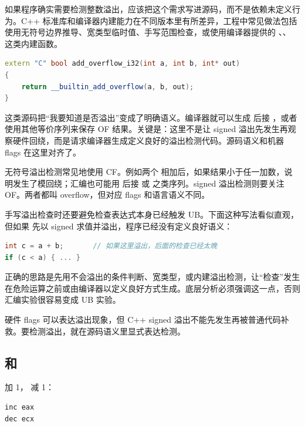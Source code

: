 如果程序确实需要检测整数溢出，应该把这个需求写进源码，而不是依赖未定义行为。C++ 标准库和编译器内建能力在不同版本里有所差异，工程中常见做法包括使用无符号边界推导、宽类型临时值、手写范围检查，或使用编译器提供的 、、 这类内建函数。

\begin{lstlisting}[language=C++]
extern "C" bool add_overflow_i32(int a, int b, int* out)
{
    return __builtin_add_overflow(a, b, out);
}
\end{lstlisting}

这类源码把“我要知道是否溢出”变成了明确语义。编译器就可以生成  后接 ，或者使用其他等价序列来保存 OF 结果。关键是：这里不是让 signed 溢出先发生再观察硬件回绕，而是请求编译器生成定义良好的溢出检测代码。源码语义和机器 flags 在这里对齐了。

无符号溢出检测常见地使用 CF。例如两个  相加后，如果结果小于任一加数，说明发生了模回绕；汇编也可能用  后接  或  之类序列。signed 溢出检测则要关注 OF。两者都叫 overflow，但对应 flags 和语言语义不同。

手写溢出检查时还要避免检查表达式本身已经触发 UB。下面这种写法看似直观，但如果  先以 signed  求值并溢出，程序已经没有定义良好语义：

\begin{lstlisting}[language=C++]
int c = a + b;       // 如果这里溢出，后面的检查已经太晚
if (c < a) { ... }
\end{lstlisting}

正确的思路是先用不会溢出的条件判断、宽类型，或内建溢出检测，让“检查”发生在危险运算之前或由编译器以定义良好方式生成。底层分析必须强调这一点，否则汇编实验很容易变成 UB 实验。

\begin{warningbox}
硬件 flags 可以表达溢出现象，但 C++ signed 溢出不能先发生再被普通代码补救。要检测溢出，就在源码语义里显式表达检测。
\end{warningbox}

\subsection{ 和 }

 加 1， 减 1：

\begin{lstlisting}
inc eax
dec ecx
\end{lstlisting}

